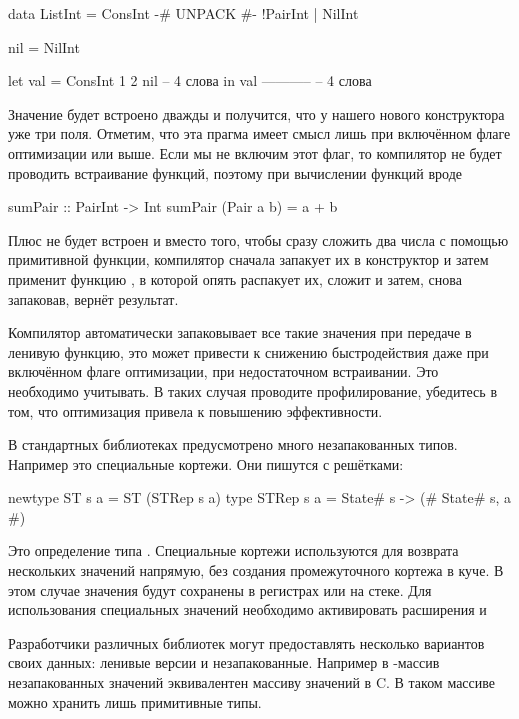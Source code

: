 \begin{code}
data ListInt = ConsInt {-# UNPACK #-} !PairInt 
             | NilInt

nil = NilInt

let val = ConsInt 1 2 nil   -- 4 слова
in  val                     -----------
                            -- 4 слова
\end{code}

Значение будет встроено дважды и получится, что у нашего нового
конструктора  уже три поля. Отметим, что эта прагма имеет смысл
лишь при включённом флаге оптимизации  или выше. Если мы не
включим этот флаг, то компилятор не будет проводить встраивание функций,
поэтому при вычислении функций вроде


\begin{code}
sumPair :: PairInt -> Int
sumPair (Pair a b) = a + b
\end{code}

Плюс не будет встроен и вместо того, чтобы сразу сложить два числа с
помощью примитивной функции, компилятор сначала запакует их в
конструктор  и затем применит функцию \In{+}, в которой опять
распакует их, сложит и затем, снова запаковав, вернёт результат.

Компилятор автоматически запаковывает все такие значения при передаче в
ленивую функцию, это может привести к снижению быстродействия даже при
включённом флаге оптимизации, при недостаточном встраивании. Это
необходимо учитывать. В таких случая проводите профилирование, убедитесь
в том, что оптимизация привела к повышению эффективности.

В стандартных библиотеках предусмотрено много незапакованных типов.
Например это специальные кортежи. Они пишутся с решётками:


\begin{code}
newtype ST s a = ST (STRep s a)
type STRep s a = State# s -> (# State# s, a #)
\end{code}

Это определение типа . Специальные кортежи используются для
возврата нескольких значений напрямую, без создания промежуточного
кортежа в куче. В этом случае значения будут сохранены в регистрах или
на стеке. Для использования специальных значений необходимо активировать
расширения  и 

Разработчики различных библиотек могут предоставлять несколько вариантов
своих данных: ленивые версии и незапакованные. Например в -массив
незапакованных значений  эквивалентен массиву
значений в C. В таком массиве можно хранить лишь примитивные типы.

